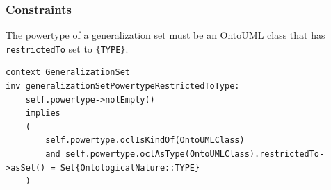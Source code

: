 




\subsubsection{Constraints}

\begin{constraint}
\label{constraint:generalizationSetPowertypeRestrictedToType}
The powertype of a generalization set must be an OntoUML class that has \texttt{restrictedTo} set to \texttt{\{TYPE\}}.

\begin{lstlisting}[language=OCL]
context GeneralizationSet
inv generalizationSetPowertypeRestrictedToType:
    self.powertype->notEmpty()
    implies
    (
        self.powertype.oclIsKindOf(OntoUMLClass)
        and self.powertype.oclAsType(OntoUMLClass).restrictedTo->asSet() = Set{OntologicalNature::TYPE}
    )
\end{lstlisting}
\end{constraint}

